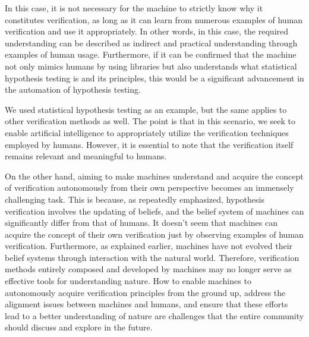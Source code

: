 In this case, it is not necessary for the machine to strictly know why it constitutes verification, as long as it can learn from numerous examples of human verification and use it appropriately. In other words, in this case, the required understanding can be described as indirect and practical understanding through examples of human usage. Furthermore, if it can be confirmed that the machine not only mimics humans by using libraries but also understands what statistical hypothesis testing is and its principles, this would be a significant advancement in the automation of hypothesis testing. 

We used statistical hypothesis testing as an example, but the same applies to other verification methods as well. The point is that in this scenario, we seek to enable artificial intelligence to appropriately utilize the verification techniques employed by humans. However, it is essential to note that the verification itself remains relevant and meaningful to humans.

On the other hand, aiming to make machines understand and acquire the concept of verification autonomously from their own perspective becomes an immensely challenging task. This is because, as repeatedly emphasized, hypothesis verification involves the updating of beliefs, and the belief system of machines can significantly differ from that of humans. It doesn't seem that machines can acquire the concept of their own verification just by observing examples of human verification. Furthermore, as explained earlier, machines have not evolved their belief systems through interaction with the natural world. Therefore, verification methods entirely composed and developed by machines may no longer serve as effective tools for understanding nature. How to enable machines to autonomously acquire verification principles from the ground up, address the alignment issues between machines and humans, and ensure that these efforts lead to a better understanding of nature are challenges that the entire community should discuss and explore in the future.


